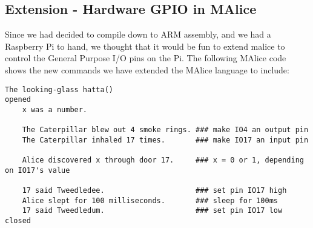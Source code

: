 \documentclass[11pt, notitlepage]{report}
\begin{document}
\subsection*{Extension - Hardware GPIO in MAlice}
Since we had decided to compile down to ARM assembly, and we had a Raspberry Pi to hand, we thought that it would be fun to extend malice to control the General Purpose I/O pins on the Pi. The following MAlice code shows the new commands we have extended the MAlice language to include:

\begin{verbatim}
The looking-glass hatta()
opened
    x was a number.

    The Caterpillar blew out 4 smoke rings. ### make IO4 an output pin
    The Caterpillar inhaled 17 times.       ### make IO17 an input pin

    Alice discovered x through door 17.     ### x = 0 or 1, depending on IO17's value

    17 said Tweedledee.                     ### set pin IO17 high
    Alice slept for 100 milliseconds.       ### sleep for 100ms
    17 said Tweedledum.                     ### set pin IO17 low
closed
\end{verbatim}
\end{document}
